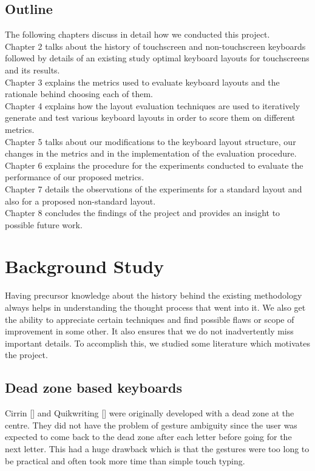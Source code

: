 \documentclass[MTech]{iitmdiss}
\begin{document}
\section{Outline}
The following chapters discuss in detail how we conducted this project.\\
Chapter 2 talks about the history of touchscreen and non-touchscreen keyboards followed by details of an existing study optimal keyboard layouts for touchscreens and its results.\\
Chapter 3 explains the metrics used to evaluate keyboard layouts and the rationale behind choosing each of them.\\
Chapter 4 explains how the layout evaluation techniques are used to iteratively generate and test various keyboard layouts in order to score them on different metrics.\\
Chapter 5 talks about our modifications to the keyboard layout structure, our changes in the metrics and in the implementation of the evaluation procedure.\\
Chapter 6 explains the procedure for the experiments conducted to evaluate the performance of our proposed metrics.\\
Chapter 7 details the observations of the experiments for a standard layout and also for a proposed non-standard layout.\\
Chapter 8 concludes the findings of the project and provides an insight to possible future work.\\

\chapter{Background Study}
Having precursor knowledge about the history behind the existing methodology always helps in understanding the thought process that went into it. We also get the ability to appreciate certain techniques and find possible flaws or scope of improvement in some other. It also ensures that we do not inadvertently miss important details. To accomplish this, we studied some literature which motivates the project.
 
\section{Dead zone based keyboards}
Cirrin [\cite{cirrin}] and Quikwriting [\cite{quicwriting}] were originally developed with a dead zone at the centre. They did not have the problem of gesture ambiguity since the user was expected to come back to the dead zone after each letter before going for the next letter. This had a huge drawback which is that the gestures were too long to be practical and often took more time than simple touch typing.
\end{document}
